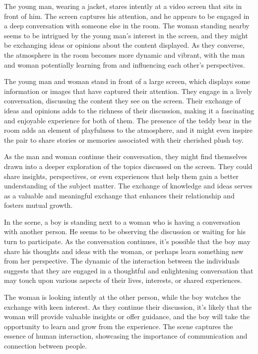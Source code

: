 \documentclass[smalldemyvopaper,11pt,twoside,onecolumn,openright,extrafontsizes]{memoir}
\begin{document}
The young man, wearing a jacket, stares intently at a video screen that sits in front of him. The screen captures his attention, and he appears to be engaged in a deep conversation with someone else in the room. The woman standing nearby seems to be intrigued by the young man's interest in the screen, and they might be exchanging ideas or opinions about the content displayed. As they converse, the atmosphere in the room becomes more dynamic and vibrant, with the man and woman potentially learning from and influencing each other's perspectives.\par
The young man and woman stand in front of a large screen, which displays some information or images that have captured their attention. They engage in a lively conversation, discussing the content they see on the screen. Their exchange of ideas and opinions adds to the richness of their discussion, making it a fascinating and enjoyable experience for both of them. The presence of the teddy bear in the room adds an element of playfulness to the atmosphere, and it might even inspire the pair to share stories or memories associated with their cherished plush toy.\par
As the man and woman continue their conversation, they might find themselves drawn into a deeper exploration of the topics discussed on the screen. They could share insights, perspectives, or even experiences that help them gain a better understanding of the subject matter. The exchange of knowledge and ideas serves as a valuable and meaningful exchange that enhances their relationship and fosters mutual growth.\par
In the scene, a boy is standing next to a woman who is having a conversation with another person. He seems to be observing the discussion or waiting for his turn to participate. As the conversation continues, it's possible that the boy may share his thoughts and ideas with the woman, or perhaps learn something new from her perspective. The dynamic of the interaction between the individuals suggests that they are engaged in a thoughtful and enlightening conversation that may touch upon various aspects of their lives, interests, or shared experiences.\par
The woman is looking intently at the other person, while the boy watches the exchange with keen interest. As they continue their discussion, it's likely that the woman will provide valuable insights or offer guidance, and the boy will take the opportunity to learn and grow from the experience. The scene captures the essence of human interaction, showcasing the importance of communication and connection between people.\par
\end{document}
